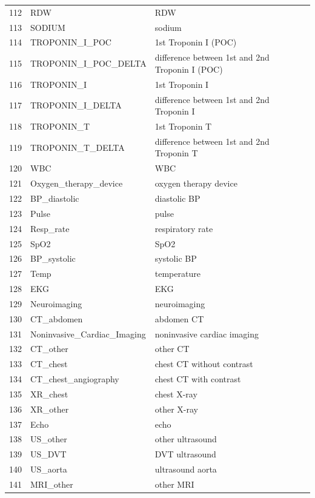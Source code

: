 \begin{longtable}{@{\extracolsep{\fill}}lll}
112 & RDW & RDW \\
113 & SODIUM & sodium \\
114 & TROPONIN\_I\_POC & 1st Troponin I (POC) \\
115 & TROPONIN\_I\_POC\_DELTA & difference between 1st and 2nd Troponin I (POC) \\
116 & TROPONIN\_I & 1st Troponin I \\
117 & TROPONIN\_I\_DELTA & difference between 1st and 2nd Troponin I \\
118 & TROPONIN\_T & 1st Troponin T \\
119 & TROPONIN\_T\_DELTA & difference between 1st and 2nd Troponin T \\
120 & WBC & WBC \\
121 & Oxygen\_therapy\_device & oxygen therapy device \\
122 & BP\_diastolic & diastolic BP \\
123 & Pulse & pulse \\
124 & Resp\_rate & respiratory rate \\
125 & SpO2 & SpO2 \\
126 & BP\_systolic & systolic BP \\
127 & Temp & temperature \\
128 & EKG & EKG \\
129 & Neuroimaging & neuroimaging \\
130 & CT\_abdomen & abdomen CT \\
131 & Noninvasive\_Cardiac\_Imaging & noninvasive cardiac imaging \\
132 & CT\_other & other CT \\
133 & CT\_chest & chest CT without contrast \\
134 & CT\_chest\_angiography & chest CT with contrast \\
135 & XR\_chest & chest X-ray \\
136 & XR\_other & other X-ray \\
137 & Echo & echo \\
138 & US\_other & other ultrasound \\
139 & US\_DVT & DVT ultrasound \\
140 & US\_aorta & ultrasound aorta \\
141 & MRI\_other & other MRI \\
\hline

\end{longtable}
